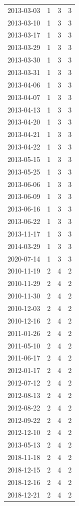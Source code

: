 \begin{tabular}{lrrr}
2013-03-03 & 1 & 3 & 3 \\
2013-03-10 & 1 & 3 & 3 \\
2013-03-17 & 1 & 3 & 3 \\
2013-03-29 & 1 & 3 & 3 \\
2013-03-30 & 1 & 3 & 3 \\
2013-03-31 & 1 & 3 & 3 \\
2013-04-06 & 1 & 3 & 3 \\
2013-04-07 & 1 & 3 & 3 \\
2013-04-13 & 1 & 3 & 3 \\
2013-04-20 & 1 & 3 & 3 \\
2013-04-21 & 1 & 3 & 3 \\
2013-04-22 & 1 & 3 & 3 \\
2013-05-15 & 1 & 3 & 3 \\
2013-05-25 & 1 & 3 & 3 \\
2013-06-06 & 1 & 3 & 3 \\
2013-06-09 & 1 & 3 & 3 \\
2013-06-16 & 1 & 3 & 3 \\
2013-06-22 & 1 & 3 & 3 \\
2013-11-17 & 1 & 3 & 3 \\
2014-03-29 & 1 & 3 & 3 \\
2020-07-14 & 1 & 3 & 3 \\
2010-11-19 & 2 & 4 & 2 \\
2010-11-29 & 2 & 4 & 2 \\
2010-11-30 & 2 & 4 & 2 \\
2010-12-03 & 2 & 4 & 2 \\
2010-12-16 & 2 & 4 & 2 \\
2011-01-26 & 2 & 4 & 2 \\
2011-05-10 & 2 & 4 & 2 \\
2011-06-17 & 2 & 4 & 2 \\
2012-01-17 & 2 & 4 & 2 \\
2012-07-12 & 2 & 4 & 2 \\
2012-08-13 & 2 & 4 & 2 \\
2012-08-22 & 2 & 4 & 2 \\
2012-09-22 & 2 & 4 & 2 \\
2012-12-10 & 2 & 4 & 2 \\
2013-05-13 & 2 & 4 & 2 \\
2018-11-18 & 2 & 4 & 2 \\
2018-12-15 & 2 & 4 & 2 \\
2018-12-16 & 2 & 4 & 2 \\
2018-12-21 & 2 & 4 & 2 \\

\end{tabular}
